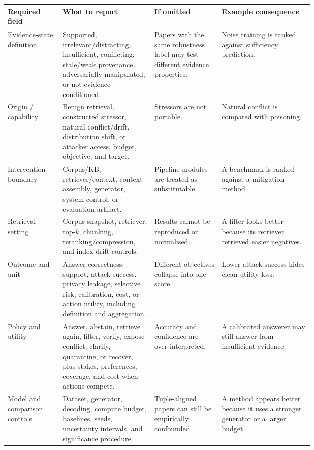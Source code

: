 \begin{table}[t]
\centering
\scriptsize
\renewcommand{\arraystretch}{0.9}
\begin{tabularx}{\linewidth}{>{\raggedright\arraybackslash}p{0.18\linewidth}>{\raggedright\arraybackslash}p{0.30\linewidth}>{\raggedright\arraybackslash}p{0.22\linewidth}X}
\toprule
\textbf{Required field} & \textbf{What to report} & \textbf{If omitted} & \textbf{Example consequence} \\
\midrule
Evidence-state definition & Supported, irrelevant/distracting, insufficient, conflicting, stale/weak provenance, adversarially manipulated, or not evidence-conditioned. & Papers with the same robustness label may test different evidence properties. & Noise training is ranked against sufficiency prediction. \\
Origin / capability & Benign retrieval, constructed stressor, natural conflict/drift, distribution shift, or attacker access, budget, objective, and target. & Stressors are not portable. & Natural conflict is compared with poisoning. \\
Intervention boundary & Corpus/KB, retriever/context, context assembly, generator, system control, or evaluation artifact. & Pipeline modules are treated as substitutable. & A benchmark is ranked against a mitigation method. \\
Retrieval setting & Corpus snapshot, retriever, top-$k$, chunking, reranking/compression, and index drift controls. & Results cannot be reproduced or normalised. & A filter looks better because its retriever retrieved easier negatives. \\
Outcome and unit & Answer correctness, support, attack success, privacy leakage, selective risk, calibration, cost, or action utility, including definition and aggregation. & Different objectives collapse into one score. & Lower attack success hides clean-utility loss. \\
Policy and utility & Answer, abstain, retrieve again, filter, verify, expose conflict, clarify, quarantine, or recover, plus stakes, preferences, coverage, and cost when actions compete. & Accuracy and confidence are over-interpreted. & A calibrated answerer may still answer from insufficient evidence. \\
Model and comparison controls & Dataset, generator, decoding, compute budget, baselines, seeds, uncertainty intervals, and significance procedure. & Tuple-aligned papers can still be empirically confounded. & A method appears better because it uses a stronger generator or a larger budget. \\

\end{tabularx}
\end{table}
